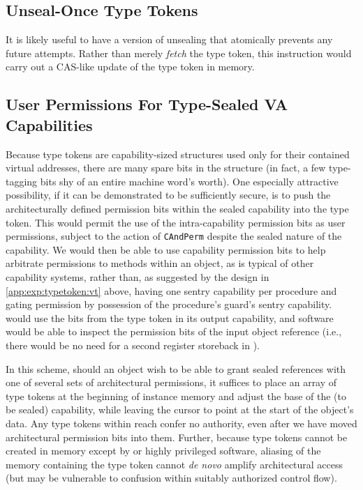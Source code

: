 \subsection{Unseal-Once Type Tokens} %

It is likely useful to have a version of unsealing that atomically prevents
any future attempts.  Rather than merely \emph{fetch} the type token, this
instruction would carry out a CAS-like update of the type token in memory.

\subsection{User Permissions For Type-Sealed VA Capabilities} %

Because type tokens are capability-sized structures used only for their
contained virtual addresses, there are many spare bits in the structure (in
fact, a few type-tagging bits shy of an entire machine word's worth).  One
especially attractive possibility, if it can be demonstrated to be
sufficiently secure, is to push the architecturally defined permission bits
within the sealed capability into the type token.  This would permit the use
of the intra-capability permission bits as user permissions, subject to the
action of \texttt{CAndPerm} despite the sealed nature of the capability.
We would then be able to use capability permission bits to help arbitrate
permissions to methods within an object, as is typical of other capability
systems, rather than, as suggested by the design in
\cref{app:exp:typetoken:vt} above, having one sentry capability per procedure
and gating permission by possession of the procedure's guard's sentry
capability.   would use the bits from the type token in
its output capability, and software would be able to inspect the permission
bits of the input object reference (i.e., there would be no need for a second
register storeback in ).

In this scheme, should an object wish to be able to grant sealed references
with one of several sets of architectural permissions, it suffices to place
an array of type tokens at the beginning of instance memory and adjust the
base of the (to be sealed) capability, while leaving the cursor to point at
the start of the object's data.  Any type tokens within reach confer no
authority, even after we have moved architectural permission bits into them.
Further, because type tokens cannot be created in memory except by
 or highly privileged software, aliasing of the
memory containing the type token cannot \emph{de novo} amplify architectural
access (but may be vulnerable to confusion within suitably authorized
control flow).

